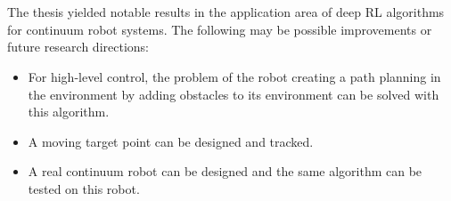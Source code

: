 \documentclass[12pt,twoside,a4]{mwbk}
\begin{document}
\\ \\
The thesis yielded notable results in the application area of deep RL algorithms for continuum robot systems. The following may be possible improvements or future research directions:
\begin{itemize}
    \item For high-level control, the problem of the robot creating a path planning in the environment by adding obstacles to its environment can be solved with this algorithm.
    \item A moving target point can be designed and tracked.
    \item  A real continuum robot can be designed and the same algorithm can be tested on this robot.
\end{itemize}
\end{document}
